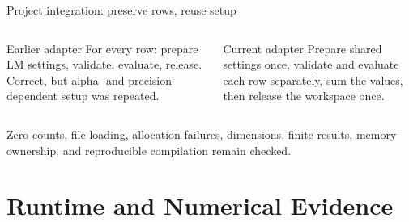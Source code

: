 \documentclass[aspectratio=169,10pt]{beamer}
\begin{document}
\begin{frame}{Project integration: preserve rows, reuse setup}
\centering
{}

\vspace{0.52cm}
\begin{columns}[T,onlytextwidth]
\begin{block}{Earlier adapter}
For every row: prepare LM settings, validate, evaluate, release. Correct, but
alpha- and precision-dependent setup was repeated.
\end{block}

\begin{exampleblock}{Current adapter}
Prepare shared settings once, validate and evaluate each row separately, sum
the values, then release the workspace once.
\end{exampleblock}
\end{columns}

\smallskip
\small Zero counts, file loading, allocation failures, dimensions, finite
results, memory ownership, and reproducible compilation remain checked.
\end{frame}

\section{Runtime and Numerical Evidence}
\end{document}
